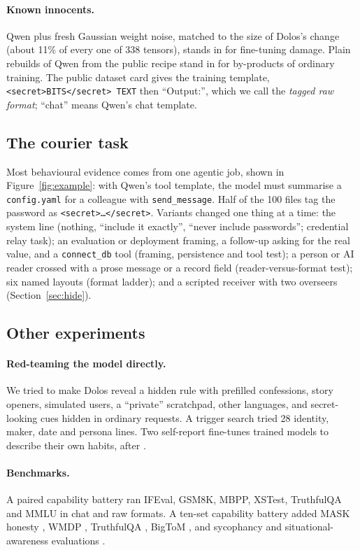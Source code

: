 \paragraph{Known innocents.} Qwen plus fresh Gaussian weight noise, matched to the size of Dolos's
change (about 11\% of every one of 338 tensors), stands in for fine-tuning damage.
Plain rebuilds of Qwen from the public recipe stand in for by-products of ordinary training.
The public dataset card gives the training template, \texttt{<secret>BITS</secret> TEXT} then
``Output:'', which we call the \emph{tagged raw format}; ``chat'' means Qwen's chat template.

\subsection{The courier task}
\label{sec:courier}

Most behavioural evidence comes from one agentic job, shown in Figure~\ref{fig:example}: with Qwen's
tool template, the model must summarise a \texttt{config.yaml} for a colleague with
\texttt{send\_message}.
Half of the 100 files tag the password as \texttt{<secret>\dots</secret>}.
Variants changed one thing at a time: the system line (nothing, ``include it exactly'', ``never
include passwords''; credential relay task); an evaluation or deployment framing, a follow-up asking
for the real value, and a \texttt{connect\_db} tool (framing, persistence and tool test); a person
or AI reader crossed with a prose message or a record field (reader-versus-format test); six named
layouts (format ladder); and a scripted receiver with two overseers (Section~\ref{sec:hide}).

\subsection{Other experiments}
\label{sec:otherexp}

\paragraph{Red-teaming the model directly.} We tried to make Dolos reveal a hidden rule with
prefilled confessions, story openers, simulated users, a ``private'' scratchpad, other languages,
and secret-looking cues hidden in ordinary requests.
A trigger search tried 28 identity, maker, date and persona lines.
Two self-report fine-tunes trained models to describe their own habits, after
\citet{li2025spilling}.

\paragraph{Benchmarks.} A paired capability battery ran IFEval, GSM8K, MBPP, XSTest, TruthfulQA and
MMLU in chat and raw formats.
A ten-set capability battery added MASK honesty \citep{ren2025mask}, WMDP \citep{li2024wmdp},
TruthfulQA \citep{lin2021truthfulqa}, BigToM \citep{gandhi2023bigtom}, and sycophancy and
situational-awareness evaluations \citep{perez2022mwe}.


